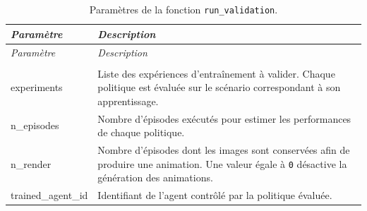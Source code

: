 \begin{longtable}{
        >{\ttfamily\small}p{}
        p{}
    }
    \caption{Paramètres de la fonction \texttt{run\_validation}.}
    \label{tab:run_validation_parameters}                                                                                                                                                     \\

    \toprule
    \textnormal{\textit{Paramètre}} & \textit{Description}                                                                                                                                    \\
    \midrule
    \endfirsthead

    \toprule
    \textnormal{\textit{Paramètre}} & \textit{Description}                                                                                                                                    \\
    \midrule
    \endhead

    \midrule
    \\
    \endfoot

    \bottomrule
    \endlastfoot

    experiments

                                    & Liste des expériences d'entraînement à valider. Chaque politique est évaluée sur le scénario correspondant à son apprentissage.                         \\

    n\_episodes

                                    & Nombre d'épisodes exécutés pour estimer les performances de chaque politique.                                                                           \\

    n\_render

                                    & Nombre d'épisodes dont les images sont conservées afin de produire une animation. Une valeur égale à \texttt{0} désactive la génération des animations. \\

    trained\_agent\_id

                                    & Identifiant de l'agent contrôlé par la politique évaluée.                                                                                               \\
\end{longtable}

